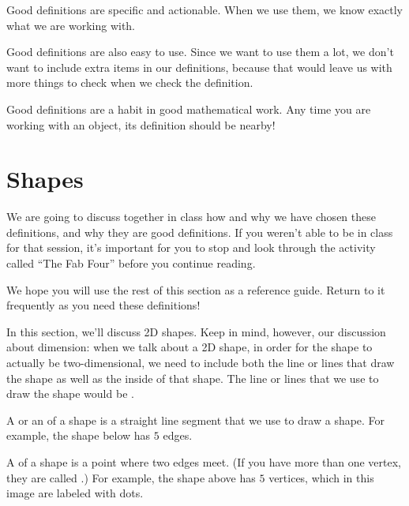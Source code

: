 \documentclass{ximera}
\begin{document}
Good definitions are specific and actionable. When we use them, we know exactly what we are working with.

Good definitions are also easy to use. Since we want to use them a lot, we don't want to include extra items in our definitions, because that would leave us with more things to check when we check the definition.

Good definitions are a habit in good mathematical work. Any time you are working with an object, its definition should be nearby!



\section{Shapes}
We are going to discuss together in class how and why we have chosen these definitions, and why they are good definitions. If you weren't able to be in class for that session, it's important for you to stop and look through the activity called ``The Fab Four'' before you continue reading.

We hope you will use the rest of this section as a reference guide. Return to it frequently as you need these definitions!

In this section, we'll discuss 2D shapes. Keep in mind, however, our discussion about dimension: when we talk about a 2D shape, in order for the shape to actually be two-dimensional, we need to include both the line or lines that draw the shape as well as the inside of that shape. The line or lines that we use to draw the shape would be .

\begin{definition}
	A  or an  of a shape is a straight line segment that we use to draw a shape. For example, the shape below has $5$ edges.
	\begin{center}
	\end{center}
\end{definition}


\begin{definition}
	A  of a shape is a point where two edges meet. (If you have more than one vertex, they are called .) For example, the shape above has $5$ vertices, which in this image are labeled with dots.
	\begin{center}
	\end{center}
\end{definition}
\end{document}
